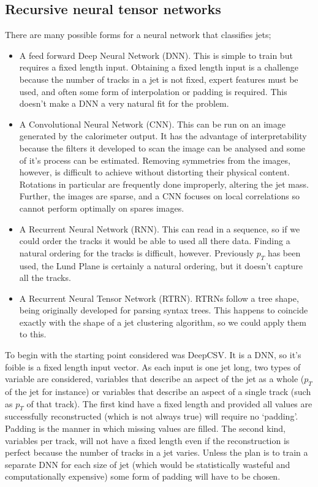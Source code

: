 \subsection{Recursive neural tensor networks}
There are many possible forms for a neural network that classifies jets;
\begin{itemize}
    \item A feed forward Deep Neural Network (DNN). This is simple to train but requires a fixed length input.
        Obtaining a fixed length input is a challenge because the number of tracks in a jet is not fixed,
        expert features must be used, and often some form of interpolation or padding is required. 
        This doesn't make a DNN a very natural fit for the problem.
    \item A Convolutional Neural Network (CNN). This can be run on an image generated by the calorimeter output.
        It has the advantage of interpretability because the filters it developed to scan the image can be analysed and some of it's process can be estimated.
        Removing symmetries from the images, however, is difficult to achieve without distorting their physical content.
        Rotations in particular are frequently done improperly, altering the jet mass.
        Further, the images are sparse, and a CNN focuses on local correlations so cannot perform optimally on spares images.
    \item A Recurrent Neural Network (RNN). This can read in a sequence, so if we could order the tracks it would be able to used all there data.
        Finding a natural ordering for the tracks is difficult, however.
        Previously \(p_T\) has been used, the Lund Plane is certainly a natural ordering,
        but it doesn't capture all the tracks.
    \item A Recurrent Neural Tensor Network (RTRN). RTRNs follow a tree shape, being originally developed for parsing syntax trees.
        This happens to coincide exactly with the shape of a jet clustering algorithm, so we could apply them to this.
\end{itemize}
To begin with the starting point considered was DeepCSV. It is a DNN, so it's foible is a fixed length input vector.
As each input is one jet long, two types of variable are considered, variables that describe an aspect of the jet as a whole
(\(p_T\) of the jet for instance) or variables that describe an aspect of a single track (such as \(p_T\) of that track).
The first kind have a fixed length and provided all values are successfully reconstructed (which is not always true)
will require no `padding'.
Padding is the manner in which missing values are filled.
The second kind, variables per track, will not have a fixed length even if the reconstruction is perfect because the number of tracks in a jet varies.
Unless the plan is to train a separate DNN for each size of jet (which would be statistically wasteful and computationally expensive)
some form of padding will have to be chosen.

